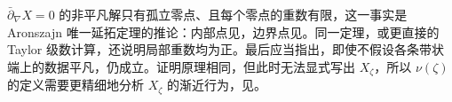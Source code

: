 \begin{note}\label{st:11.6}
$\bar\partial_\nabla X=0$ 的非平凡解只有孤立零点、且每个零点的重数有限，这一事实是 Aronszajn 唯一延拓定理的推论：内部点见，边界点见。同一定理，或更直接的 Taylor 级数计算，还说明局部重数均为正。最后应当指出，即使不假设各条带状端上的数据平凡，仍成立。证明原理相同，但此时无法显式写出 $X_\zeta$，所以 $\nu(\zeta)$ 的定义需要更精细地分析 $X_\zeta$ 的渐近行为，见。
\end{note}
